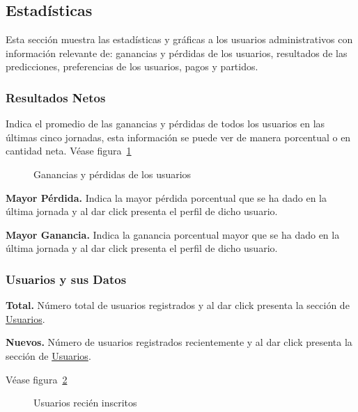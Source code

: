 \subsection{Estadísticas}

Esta sección muestra las estadísticas y gráficas a los usuarios administrativos con información relevante de: ganancias y pérdidas de los usuarios, resultados de las predicciones, preferencias de los usuarios, pagos y partidos.

\subsubsection{Resultados Netos}

Indica el promedio de las ganancias y pérdidas de todos los usuarios en las últimas cinco jornadas, esta información se puede ver de manera porcentual o en cantidad neta.
Véase figura~\ref{Fig:mayor-ganancia}
\begin{figure}[!htb]\centering
   \begin {minipage}{0.4\textwidth}
     \caption{Ganancias y pérdidas de los usuarios}
	 \label{Fig:mayor-ganancia}
   \end{minipage}
\end{figure}


\textbf{Mayor Pérdida.}
Indica la mayor pérdida porcentual que se ha dado en la última jornada y al dar click presenta el perfil de dicho usuario.

\textbf{Mayor Ganancia.}
Indica la ganancia porcentual mayor que se ha dado en la última jornada y al dar click presenta el perfil de dicho usuario.


\subsubsection{Usuarios y sus Datos}

\textbf{Total.} Número total de usuarios registrados y al dar click presenta la sección de \underline{Usuarios}.

\textbf{Nuevos.} Número de usuarios registrados recientemente y al dar click presenta la sección de \underline{Usuarios}.

Véase figura~\ref{Fig:nuevos-usuarios}
\begin{figure}[!htb]\centering
   \begin {minipage}{0.4\textwidth}
     \caption{Usuarios recién inscritos}
	 \label{Fig:nuevos-usuarios}
   \end{minipage}
\end{figure}

